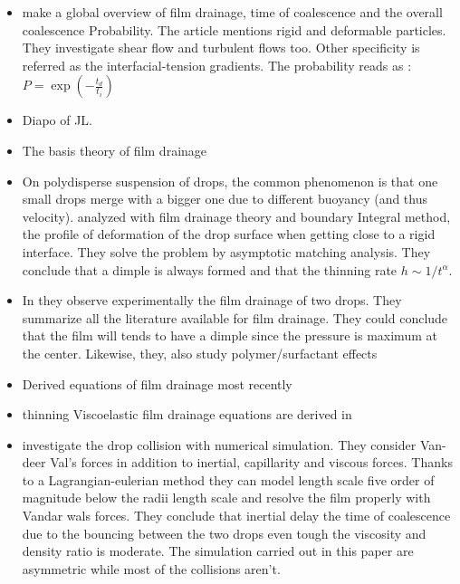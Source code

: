 \begin{itemize}
    \item \citet{chesters1991modelling} make a global overview of film drainage, time of coalescence and the overall coalescence Probability. The article mentions rigid and deformable particles. They investigate shear flow and turbulent flows too. Other specificity is referred as the interfacial-tension gradients.
    The probability reads as : $P = \exp(-\frac{t_d}{t_i})$
\end{itemize}
\begin{itemize}
    \item Diapo of JL. 
    \item The basis theory of film drainage \citet{jones1978film}
    \item On polydisperse suspension of drops, the common phenomenon is that one small drops merge with a bigger one due to different buoyancy (and thus velocity). 
    \citet{yiantsios1990buoyancy} analyzed with film drainage theory and boundary Integral method, the profile of deformation of the drop surface when getting close to a rigid interface.
    They solve  the problem by asymptotic matching analysis. 
    They conclude that a dimple is always formed and that the thinning rate $h\sim 1/t^\alpha$.
    \item In \cite{leal2004flow} they observe experimentally the film drainage of two drops. 
        They summarize all the literature available for film drainage.
        They could conclude that the film will tends to have a dimple since the pressure is maximum at the center.
        Likewise, they, also study polymer/surfactant effects 
    \item Derived equations of film drainage most recently \cite{leal2007advanced}
    \item thinning Viscoelastic film drainage equations are derived in \citet{bousfield1989thinning} 
    \item \citet{sambath2019inertial}  investigate the drop collision with numerical simulation.
    They consider Van-deer Val's forces in addition to inertial, capillarity and viscous forces.
    Thanks to a Lagrangian-eulerian method they can model length scale five order of magnitude below the radii length scale and resolve the film properly with Vandar wals forces. 
    They conclude that inertial delay the time of coalescence due to the bouncing between the two drops even tough the viscosity and density ratio is moderate. 
    The simulation carried out in this paper are asymmetric while most of the collisions aren't.
\end{itemize}
